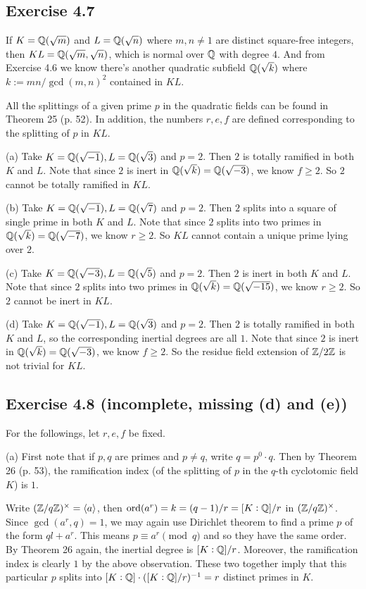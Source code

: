 \documentclass[../Marcus.tex]{subfiles}
\begin{document}
\subsection*{Exercise 4.7}

If $K=\mathbb{Q}(\sqrt{m})$ and $L=\mathbb{Q}(\sqrt{n})$ where $m,n\neq 1$ are distinct square-free integers, then $KL=\mathbb{Q}(\sqrt{m},\sqrt{n})$, which is normal over $\mathbb{Q}$ with degree $4$. And from Exercise 4.6 we know there's another quadratic subfield $\mathbb{Q}(\sqrt{k})$ where $k:=mn/\gcd(m,n)^2$ contained in $KL$.

All the splittings of a given prime $p$ in the quadratic fields can be found in Theorem 25 (p. 52). In addition, the numbers $r,e,f$ are defined corresponding to the splitting of $p$ in $KL$.

(a) Take $K=\mathbb{Q}(\sqrt{-1}),L=\mathbb{Q}(\sqrt{3})$ and $p=2$. Then $2$ is totally ramified in both $K$ and $L$. Note that since $2$ is inert in $\mathbb{Q}(\sqrt{k})=\mathbb{Q}(\sqrt{-3})$, we know $f\geq 2$. So $2$ cannot be totally ramified in $KL$.

(b) Take $K=\mathbb{Q}(\sqrt{-1}),L=\mathbb{Q}(\sqrt{7})$ and $p=2$. Then $2$ splits into a square of single prime in both $K$ and $L$. Note that since $2$ splits into two primes in $\mathbb{Q}(\sqrt{k})=\mathbb{Q}(\sqrt{-7})$, we know $r\geq 2$. So $KL$ cannot contain a unique prime lying over $2$.

(c) Take $K=\mathbb{Q}(\sqrt{-3}),L=\mathbb{Q}(\sqrt{5})$ and $p=2$. Then $2$ is inert in both $K$ and $L$. Note that since $2$ splits into two primes in $\mathbb{Q}(\sqrt{k})=\mathbb{Q}(\sqrt{-15})$, we know $r\geq 2$. So $2$ cannot be inert in $KL$.

(d) Take $K=\mathbb{Q}(\sqrt{-1}),L=\mathbb{Q}(\sqrt{3})$ and $p=2$. Then $2$ is totally ramified in both $K$ and $L$, so the corresponding inertial degrees are all $1$. Note that since $2$ is inert in $\mathbb{Q}(\sqrt{k})=\mathbb{Q}(\sqrt{-3})$, we know $f\geq 2$. So the residue field extension of $\mathbb{Z}/2\mathbb{Z}$ is not trivial for $KL$.

\subsection*{Exercise 4.8 \color{red}(incomplete, missing (d) and (e))}

For the followings, let $r,e,f$ be fixed.

(a) First note that if $p,q$ are primes and $p\neq q$, write $q=p^0\cdot q$. Then by Theorem 26 (p. 53), the ramification index (of the splitting of $p$ in the $q$-th cyclotomic field $K$) is $1$.

Write $(\mathbb{Z}/q\mathbb{Z})^\times=\langle a\rangle$, then $\operatorname{ord}(a^r)=k=(q-1)/r=[K:\mathbb{Q}]/r$ in $(\mathbb{Z}/q\mathbb{Z})^\times$. Since $\gcd(a^r,q)=1$, we may again use Dirichlet theorem to find a prime $p$ of the form $ql+a^r$. This means $p\equiv a^r \pmod{q}$ and so they have the same order. By Theorem 26 again, the inertial degree is $[K:\mathbb{Q}]/r$. Moreover, the ramification index is clearly $1$ by the above observation. These two together imply that this particular $p$ splits into $[K:\mathbb{Q}]\cdot([K:\mathbb{Q}]/r)^{-1}=r$ distinct primes in $K$.
\end{document}
